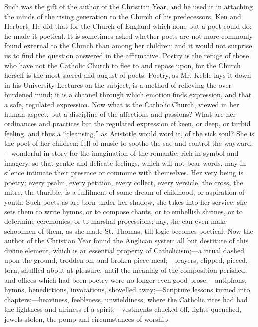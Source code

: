 Such was the gift of the author of the Christian
Year, and he used it in attaching the minds of the rising generation
to the Church of his predecessors, Ken and Herbert. He did that for
the Church of England which none but a poet could do: he made it
poetical. It is sometimes asked whether poets are not more commonly
found external to the Church than among her children; and it would not
surprise us to find the question answered in the affirmative. Poetry
is the refuge of those who have not the Catholic Church to flee to and
repose upon, for the Church herself is the most sacred and august of
poets. Poetry, as Mr. Keble lays it down in his University Lectures on
the subject, is a method of relieving the over-burdened mind; it is a
channel through which emotion finds expression, and that a safe,
regulated expression. Now what is the Catholic Church, viewed in her
human aspect, but a discipline of the affections and passions? What
are her ordinances and practices but the regulated expression of keen,
or deep, or turbid feeling, and thus a ``cleansing,'' as Aristotle would
word it, of the sick soul? She is the poet of her children; full of
music to soothe the sad and control the wayward,—wonderful in story
for the imagination of the romantic; rich in symbol and imagery, so
that gentle and delicate feelings, which will not bear words, may in silence intimate their presence or commune with themselves. Her
very being is poetry; every psalm, every petition, every collect,
every versicle, the cross, the mitre, the thurible, is a fulfilment of
some dream of childhood, or aspiration of youth. Such poets as are
born under her shadow, she takes into her service; she sets them to
write hymns, or to compose chants, or to embellish shrines, or to
determine ceremonies, or to marshal processions; nay, she can even
make schoolmen of them, as she made St. Thomas, till logic becomes
poetical. Now the author of the Christian Year found the Anglican
system all but destitute of this divine element, which is an essential
property of Catholicism;—a ritual dashed upon the ground, trodden
on, and broken piece-meal;—prayers, clipped, pieced, torn, shuffled
about at pleasure, until the meaning of the composition perished, and
offices which had been poetry were no longer even good
prose;—antiphons, hymns, benedictions, invocations, shovelled
away;—Scripture lessons turned into chapters;—heaviness,
feebleness, unwieldiness, where the Catholic rites had had the
lightness and airiness of a spirit;—vestments chucked off, lights
quenched, jewels stolen, the pomp and circumstances of worship
